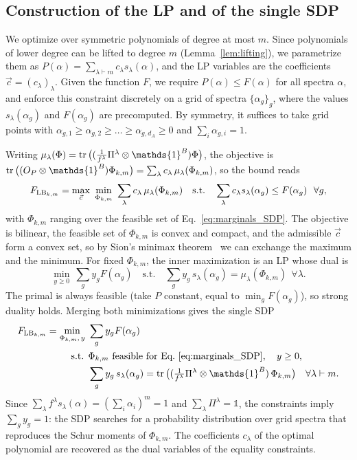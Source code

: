 \documentclass[aps,pra,twocolumn,showpacs,superscriptaddress,groupedaddress]{revtex4-2}
\newcommand{\one}[0]{\mathds{1}}
\renewcommand{\a}{\alpha}
\newcommand{\I}{\one}
\begin{document}
\begin{widetext}
\subsection{Construction of the LP and of the single SDP}
We optimize over symmetric polynomials of degree at most $m$. Since polynomials of lower degree can be lifted to degree $m$ (Lemma~\ref{lem:lifting}), we parametrize them as $P(\a)=\sum_{\lambda\vdash m}c_\lambda s_\lambda(\a)$, and the LP variables are the coefficients $\vec c=(c_\lambda)_\lambda$. Given the function $F$, we require $P(\a)\leq F(\a)$ for all spectra $\a$, and enforce this constraint discretely on a grid of spectra $\{\a_g\}_g$, where the values $s_\lambda(\a_g)$ and $F(\a_g)$ are precomputed. By symmetry, it suffices to take grid points with $\a_{g,1}\geq\a_{g,2}\geq\dots\geq\a_{g,d_A}\geq0$ and $\sum_i\a_{g,i}=1$.

Writing $\mu_\lambda(\Phi)=\tr\big((\tfrac{1}{f^\lambda}\Pi^\lambda\otimes\I^B)\Phi\big)$, the objective is $\tr\big((O_P\otimes\I^B)\Phi_{k,m}\big)=\sum_\lambda c_\lambda\,\mu_\lambda(\Phi_{k,m})$, so the bound reads
\begin{equation}
    F_{{\rm LB}_{k,m}}=\max_{\vec c}\ \min_{\Phi_{k,m}}\ \sum_\lambda c_\lambda\,\mu_\lambda(\Phi_{k,m})
    \quad\text{s.t.}\quad \sum_\lambda c_\lambda s_\lambda(\a_g)\leq F(\a_g)\ \ \forall g,
\end{equation}
with $\Phi_{k,m}$ ranging over the feasible set of Eq.~\eqref{eq:marginals_SDP}. The objective is bilinear, the feasible set of $\Phi_{k,m}$ is convex and compact, and the admissible $\vec c$ form a convex set, so by Sion's minimax theorem~\cite{Sion1958} we can exchange the maximum and the minimum. For fixed $\Phi_{k,m}$, the inner maximization is an LP whose dual is
\begin{equation}
    \min_{y\geq0}\ \sum_g y_g F(\a_g)\quad\text{s.t.}\quad \sum_g y_g\,s_\lambda(\a_g)=\mu_\lambda(\Phi_{k,m})\ \ \forall\lambda .
\end{equation}
The primal is always feasible (take $P$ constant, equal to $\min_g F(\a_g)$), so strong duality holds. Merging both minimizations gives the single SDP
\begin{align}
    F_{{\rm LB}_{k,m}}=\min_{\Phi_{k,m},\,y}\ & \sum_g y_g F(\a_g)\\
    \text{s.t. }& \Phi_{k,m}\ \text{feasible for Eq.~\eqref{eq:marginals_SDP}},\quad y\geq0, \nonumber\\
    & \sum_g y_g\,s_\lambda(\a_g)=\tr\big((\tfrac{1}{f^\lambda}\Pi^\lambda\otimes\I^B)\,\Phi_{k,m}\big)\quad\forall\lambda\vdash m. \nonumber
\end{align}
Since $\sum_\lambda f^\lambda s_\lambda(\a)=(\sum_i\a_i)^m=1$ and $\sum_\lambda\Pi^\lambda=\I$, the constraints imply $\sum_g y_g=1$: the SDP searches for a probability distribution over grid spectra that reproduces the Schur moments of $\Phi_{k,m}$. The coefficients $c_\lambda$ of the optimal polynomial are recovered as the dual variables of the equality constraints.


\end{widetext}
\end{document}
